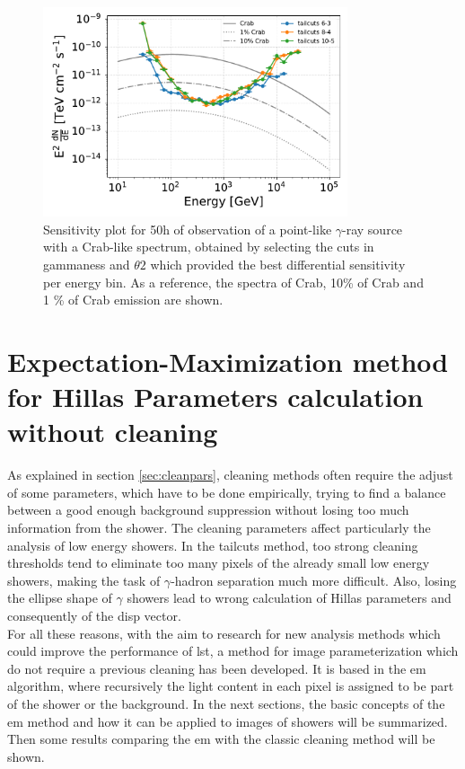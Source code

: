 \documentclass[main.tex]{subfiles}
\begin{document}
\begin{figure}
\centering
 \includegraphics[width=0.8\textwidth]{Pictures/sensitivity.pdf}
  \caption{Sensitivity plot for 50h of observation of a point-like $\gamma$-ray source with a Crab-like spectrum, obtained by selecting the cuts in gammaness and $\theta2$ which provided the best differential sensitivity per energy bin. As a reference, the spectra of Crab, 10\% of Crab and 1 \% of Crab emission are shown.}
    \label{fig:sens}
\end{figure}

\section[Expectation-Maximization method for Hillas Parameters...]{Expectation-Maximization method for Hillas Parameters calculation without cleaning} \label{sec:EM}

As explained in section \ref{sec:cleanpars}, cleaning methods often require the adjust of some parameters, which have to be done empirically, trying to find a balance between a good enough background suppression without losing too much information from the shower. The cleaning parameters affect particularly the analysis of low energy showers. In the tailcuts method, too strong cleaning thresholds tend to eliminate too many pixels of the already small low energy showers, making the task of $\gamma$-hadron separation much more difficult. Also, losing the ellipse shape of $\gamma$ showers lead to wrong calculation of Hillas parameters and consequently of the disp vector.\\
For all these reasons, with the aim to research for new analysis methods which could improve the performance of \gls{lst}, a method for image parameterization which do not require a previous cleaning has been developed. It is based in the \gls{em} algorithm, where recursively the light content in each pixel is assigned to be part of the shower or the background. In the next sections, the basic concepts of the \gls{em} method and how it can be applied to images of showers will be summarized. Then some results comparing the \gls{em} with the classic cleaning method will be shown. 
\end{document}
